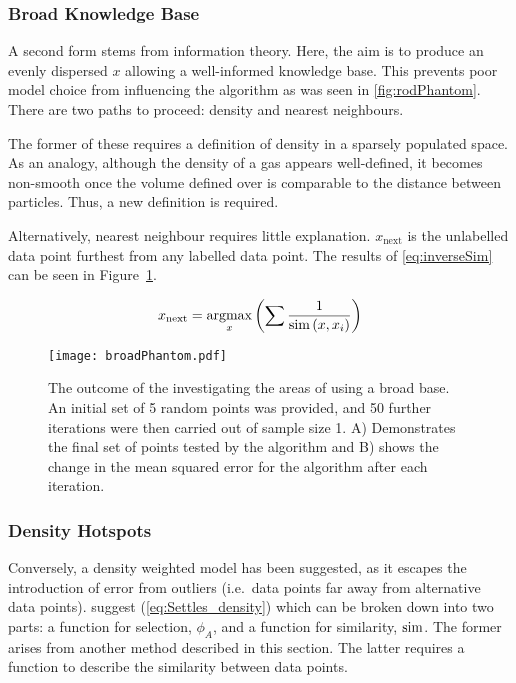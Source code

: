 \subsubsection{Broad Knowledge Base}
A second form stems from information theory. Here, the aim is to produce an evenly dispersed $x$ allowing a well-informed knowledge base. This prevents poor model choice from influencing the algorithm as was seen in \ref{fig:rodPhantom}. There are two paths to proceed: density and nearest neighbours.

The former of these requires a definition of density in a sparsely populated space. As an analogy, although the density of a gas appears well-defined, it becomes non-smooth once the volume defined over is comparable to the distance between particles. Thus, a new definition is required.

Alternatively, nearest neighbour requires little explanation. $x_\mathrm{next}$ is the unlabelled data point furthest from any labelled data point. The results of \ref{eq:inverseSim} can be seen in Figure~\ref{fig:b}.

\begin{equation}
  \label{eq:inverseSim}
  x_\mathrm{next}=\operatorname*{argmax}_x{\left(\sum{\frac{1}{\operatorname*{sim}{(x, x_i)}}}\right)}
\end{equation}

\begin{figure}[H]
  \begin{center}
    \texttt{[image: broadPhantom.pdf]}
    \caption[Broad-Base Sampling Illustration]{The outcome of the investigating the areas of using a broad base. An initial set of 5 random points was provided, and 50 further iterations were then carried out of sample size 1. A) Demonstrates the final set of points tested by the algorithm and B) shows the change in the mean squared error for the algorithm after each iteration.}
    \label{fig:b}
  \end{center}
\end{figure}


\subsubsection{Density Hotspots}
Conversely, a density weighted model has been suggested, as it escapes the introduction of error from outliers (i.e.\ data points far away from alternative data points). \textcite{Set08} suggest (\ref{eq:Settles_density}) which can be broken down into two parts: a function for selection, $\phi_A$, and a function for similarity, $\operatorname*{sim}$. The former arises from  another method described in this section. The latter requires a function to describe the similarity between data points.


